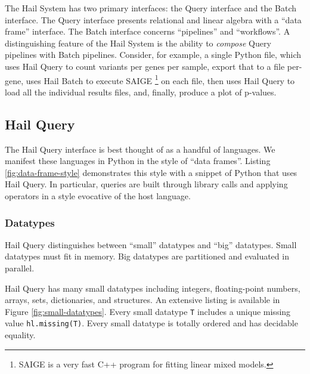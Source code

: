 \documentclass[10pt,a4paper%
]{article}
\begin{document}
The Hail System has two primary interfaces: the Query interface and the Batch interface.
The Query interface presents relational and linear algebra with a ``data frame'' interface.
The Batch interface concerns ``pipelines'' and ``workflows''.
A distinguishing feature of the Hail System is the ability to \emph{compose} Query pipelines with Batch pipelines.
Consider, for example, a single Python file, which uses Hail Query to count variants per genes per sample, export that to a file per-gene, uses Hail Batch to execute SAIGE%
\footnote{SAIGE is a very fast C++ program for fitting linear mixed models.}
on each file, then uses Hail Query to load all the individual results files, and, finally, produce a plot of p-values.

\subsection{Hail Query}

The Hail Query interface is best thought of as a handful of languages.
We manifest these languages in Python in the style of ``data frames''.
Listing \ref{fig:data-frame-style} demonstrates this style with a snippet of Python that uses Hail Query.
In particular, queries are built through library calls and applying operators in a style evocative of the host language.

\subsubsection{Datatypes}

Hail Query distinguishes between ``small'' datatypes and  ``big'' datatypes.
Small datatypes must fit in memory.
Big datatypes are partitioned and evaluated in parallel.

Hail Query has many small datatypes including integers, floating-point numbers, arrays, sets, dictionaries, and structures.
An extensive listing is available in Figure \ref{fig:small-datatypes}.
Every small datatype \texttt{T} includes a unique missing value \texttt{hl.missing(T)}.
Every small datatype is totally ordered and has decidable equality.
\end{document}
